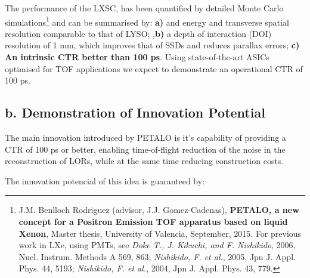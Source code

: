 \documentclass[11pt,a4paper]{article}
\begin{document}
 
 The performance of the LXSC, has been quantified by detailed Monte Carlo simulations\footnote{J.M. Benlloch Rodriguez (advisor, J.J. Gomez-Cadenas), {\bf PETALO, a new concept for a Positron Emission TOF apparatus based on liquid Xenon}, Master thesis, University of Valencia, September, 2015. For previous work in LXe, using PMTs, see
 {\em Doke T., J. Kikuchi, and F. Nishikido}, 2006, 
Nucl. Instrum. Methods A 569, 863;  {\em Nishikido, F. et al.}, 2005, Jpn J. Appl. Phys. 44, 5193; {\em Nishikido, F. et al.}, 2004, Jpn J. Appl. Phys. 43, 779.}
 and can be summarised by: {\bf a)} and energy and transverse spatial resolution comparable to that of LYSO; ,{\bf b)} a depth of interaction  (DOI) resolution of 1 mm, which improves that of SSDs and reduces parallax errors;  {\bf c) An intrinsic CTR better than 100 ps}. Using state-of-the-art ASICs optimised for TOF applications we expect to demonstrate an operational CTR of 100 ps.   
 
\subsection*{b. Demonstration of Innovation Potential}
\begin{framed}
The main innovation introduced by PETALO is it's capability of providing a CTR of 100 ps or better, enabling time-of-flight reduction of the noise in the reconstruction of LORs, while at the same time reducing construction costs. 
 \end{framed}
The innovation potencial of this idea is guaranteed by:
\end{document}
